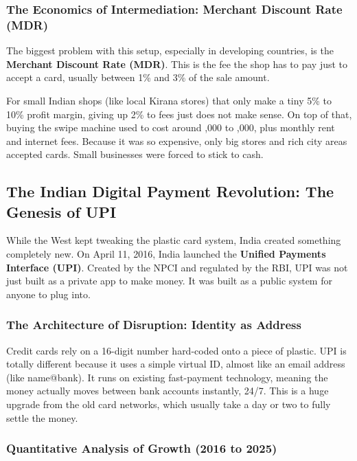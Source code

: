 \subsubsection{The Economics of Intermediation: Merchant Discount Rate (MDR)}

The biggest problem with this setup, especially in developing countries, is the \textbf{Merchant Discount Rate (MDR)}. This is the fee the shop has to pay just to accept a card, usually between 1\% and 3\% of the sale amount.

For small Indian shops (like local Kirana stores) that only make a tiny 5\% to 10\% profit margin, giving up 2\% to fees just does not make sense. On top of that, buying the swipe machine used to cost around ,000 to ,000, plus monthly rent and internet fees. Because it was so expensive, only big stores and rich city areas accepted cards. Small businesses were forced to stick to cash.

\subsection{The Indian Digital Payment Revolution: The Genesis of UPI}

While the West kept tweaking the plastic card system, India created something completely new. On April 11, 2016, India launched the \textbf{Unified Payments Interface (UPI)}. Created by the NPCI and regulated by the RBI, UPI was not just built as a private app to make money. It was built as a public system for anyone to plug into.

\subsubsection{The Architecture of Disruption: Identity as Address}

Credit cards rely on a 16-digit number hard-coded onto a piece of plastic. UPI is totally different because it uses a simple virtual ID, almost like an email address (like name@bank). It runs on existing fast-payment technology, meaning the money actually moves between bank accounts instantly, 24/7. This is a huge upgrade from the old card networks, which usually take a day or two to fully settle the money.

\subsubsection{Quantitative Analysis of Growth (2016 to 2025)}

